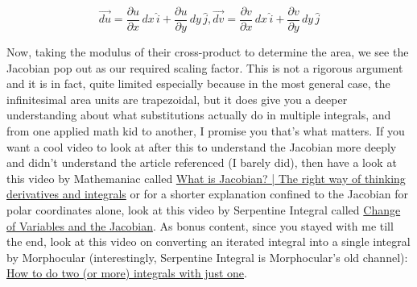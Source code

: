 \documentclass{article}
\begin{document}
$$\vec{du}=\frac{\partial{u}}{\partial{x}} \, dx \,  \hat{i}+\frac{\partial{u}}{\partial{y}} \, dy \, \hat{j}, \vec{dv}=\frac{\partial{v}}{\partial{x}} \, dx \, \hat{i}+\frac{\partial{v}}{\partial{y}} \, dy \, \hat{j}$$ 

Now, taking the modulus of their cross-product to determine the area, we see the Jacobian pop out as our required scaling factor. This is not a rigorous argument and it is in fact, quite limited especially because in the most general case, the infinitesimal area units are trapezoidal,  but it does give you a deeper understanding about what substitutions actually do in multiple integrals, and from one applied math kid to another, I promise you that's what matters. If you want a cool video to look at after this to understand the Jacobian more deeply and didn't understand the article referenced (I barely did), then have a look at this video by Mathemaniac called \href{https://youtu.be/wCZ1VEmVjVo?si=RpTSiYKiLrIdY2TD}{What is Jacobian? | The right way of thinking derivatives and integrals} or for a shorter explanation confined to the Jacobian for polar coordinates alone, look at this video by Serpentine Integral called \href{https://youtu.be/hhFzJvaY__U?si=I8jbUZuOSlrOl1XX}{Change of Variables and the Jacobian}. As bonus content, since you stayed with me till the end, look at this video on converting an iterated integral into a single integral by Morphocular (interestingly, Serpentine Integral is Morphocular's old channel): \href{https://www.youtube.com/watch?v=jNpKKDekS6k}{How to do two (or more) integrals with just one}.
\end{document}
